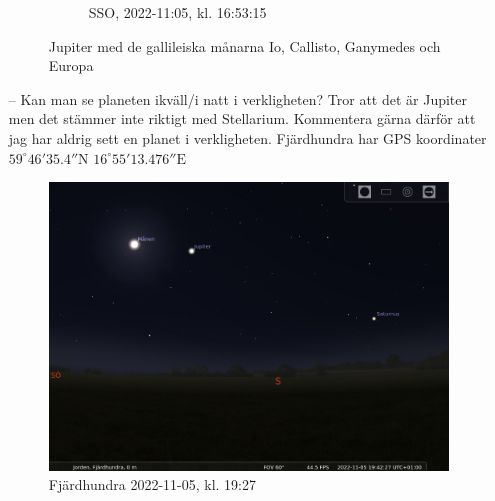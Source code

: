 \documentclass[./exercises.tex]{subfiles}
\begin{document}
\begin{itemize}
\begin{figure}[htbp]
\begin{subfigure}[b]{0.45\textwidth}
         \caption{SSO, 2022-11:05, kl. 16:53:15}
         \label{fig:three sin x}
     \end{subfigure}
     \hfill
        \caption{Jupiter med de gallileiska månarna Io, Callisto, Ganymedes och Europa}
        \label{fig:perod graphs}
\end{figure}
\newpage
\item[--] Kan man se planeten ikväll/i natt i verkligheten?
Tror att det är Jupiter men det stämmer inte riktigt med Stellarium.
Kommentera gärna därför att jag har aldrig sett en planet i verkligheten.
Fjärdhundra har GPS koordinater $59^\circ 46' 35.4''\text{N}$ $16^\circ 55' 13.476''\text{E}$
\begin{figure}[H]
\centering
  \includegraphics[scale=0.3]{stellarium-049.png}
  \caption{Fjärdhundra 2022-11-05, kl. 19:27 }
  \label{fig4}
\end{figure}


\end{itemize}
\end{document}
